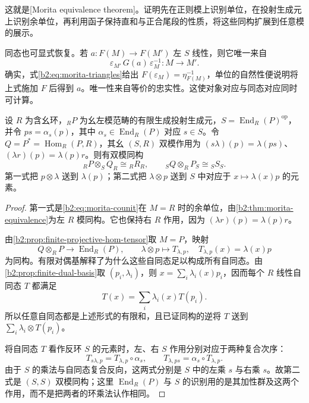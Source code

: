 这就是[Morita equivalence theorem]。证明先在正则模上识别单位，在投射生成元上识别余单位，再利用函子保持直和与正合尾段的性质，将这些同构扩展到任意模的展示。

\ProseParagraphBreak
同态也可显式恢复。若 \(a:F(M)\rightarrow F(M')\) 左 \(S\) 线性，则它唯一来自
\[
	\varepsilon_{M'}\,G(a)\,\varepsilon_M^{-1}:M\longrightarrow M'.
\]
确实，式\eqref{b2:eq:morita-triangles}给出 \(F(\varepsilon_M)=\eta_{F(M)}^{-1}\)，单位的自然性便说明将上式施加 \(F\) 后得到 \(a\)。唯一性来自等价的忠实性。这使对象对应与同态对应同时可计算。

\begin{corollary}[互逆双模]\label{b2:cor:morita-inverse-bimodules}
	设 \(R\) 为含幺环，\({}_RP\) 为幺左模范畴的有限生成投射生成元，\(S=\operatorname{End}_R(P)^{\mathrm{op}}\)，并令 \(ps=\alpha_s(p)\)，其中 \(\alpha_s\in\operatorname{End}_R(P)\) 对应 \(s\in S\)。令 \(Q=P^*=\operatorname{Hom}_R(P,R)\)，其幺 \((S,R)\) 双模作用为 \((s\lambda)(p)=\lambda(ps)\)、\((\lambda r)(p)=\lambda(p)r\)。则有双模同构
	\[
		{}_RP\otimes_S Q_R\cong {}_RR_R,\qquad {}_SQ\otimes_RP_S\cong {}_SS_S.
	\]
	第一式把 \(p\otimes\lambda\) 送到 \(\lambda(p)\)；第二式把 \(\lambda\otimes p\) 送到 \(S\) 中对应于 \(x\mapsto\lambda(x)p\) 的元素。
\end{corollary}
\begin{proof}
	第一式是\eqref{b2:eq:morita-counit}在 \(M=R\) 时的余单位，由\cref{b2:thm:morita-equivalence}为左 \(R\) 模同构。它也保持右 \(R\) 作用，因为 \((\lambda r)(p)=\lambda(p)r\)。

	由\cref{b2:prop:finite-projective-hom-tensor}取 \(M=P\)，映射
	\[
		Q\otimes_RP\longrightarrow\operatorname{End}_R(P),\qquad \lambda\otimes p\longmapsto T_{\lambda,p},\quad T_{\lambda,p}(x)=\lambda(x)p
	\]
	为同构。有限对偶基解释了为什么这些自同态足以构成所有自同态。由\cref{b2:prop:finite-dual-basis}取 \((p_i,\lambda_i)\)，则 \(x=\sum_i\lambda_i(x)p_i\)，因而每个 \(R\) 线性自同态 \(T\) 都满足
	\[
		T(x)=\sum_i\lambda_i(x)T(p_i).
	\]
	所以任意自同态都是上述形式的有限和，且已证同构的逆将 \(T\) 送到 \(\sum_i\lambda_i\otimes T(p_i)\)。

	将自同态 \(T\) 看作反环 \(S\) 的元素时，左、右 \(S\) 作用分别对应于两种复合次序：
	\[
		T_{s\lambda,p}=T_{\lambda,p}\circ\alpha_s,\qquad T_{\lambda,ps}=\alpha_s\circ T_{\lambda,p}.
	\]
	由于 \(S\) 的乘法与自同态复合反向，这两式分别是 \(S\) 中的左乘 \(s\) 与右乘 \(s\)。故第二式是 \((S,S)\) 双模同构；这里 \(\operatorname{End}_R(P)\) 与 \(S\) 的识别用的是其加性群及这两个作用，而不是把两者的环乘法认作相同。
\end{proof}

